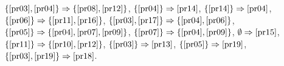 \documentclass[a4paper]{article}
\begin{document}
$\{\ref{pr03}, \ref{pr04}\} \Rightarrow \{\ref{pr08}, \ref{pr12}\}$,
$\{\ref{pr04}\} \Rightarrow \ref{pr14}$,
$\{\ref{pr14}\} \Rightarrow \ref{pr04}$,
$\{\ref{pr06}\} \Rightarrow \{\ref{pr11}, \ref{pr16}\}$,
$\{\ref{pr03}, \ref{pr17}\} \Rightarrow \{\ref{pr04}, \ref{pr06}\}$,
$\{\ref{pr05}\} \Rightarrow \{\ref{pr04}, \ref{pr07}, \ref{pr09}\}$,
$\{\ref{pr07}\} \Rightarrow \{\ref{pr04}, \ref{pr09}\}$,
$\emptyset \Rightarrow \ref{pr15}$,
$\{\ref{pr11}\} \Rightarrow \{\ref{pr10}, \ref{pr12}\}$,
$\{\ref{pr03}\} \Rightarrow \ref{pr13}$,
$\{\ref{pr05}\} \Rightarrow \ref{pr19}$,
$\{\ref{pr03}, \ref{pr19}\} \Rightarrow \ref{pr18}$.

\end{document}
